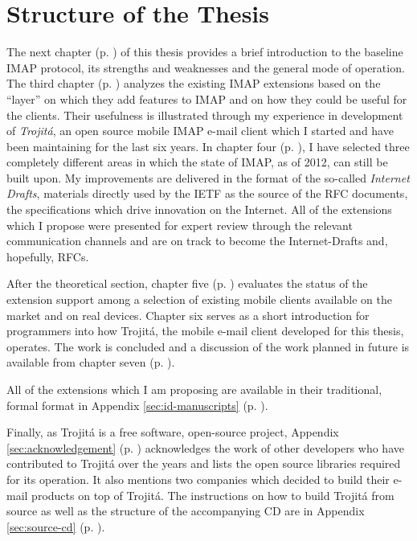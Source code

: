 \documentclass[trojita]{subfiles}
\begin{document}
\section{Structure of the Thesis}

The next chapter (p. \pageref{sec:imap-protocol}) of this thesis provides a brief introduction to the baseline IMAP
protocol, its strengths and weaknesses and the general mode of operation.  The third chapter (p.
\pageref{sec:imap-extensions}) analyzes the existing IMAP extensions based on the ``layer'' on which they add features
to IMAP and on how they could be useful for the clients.  Their usefulness is illustrated through my experience in
development of {\em Trojitá}, an open source mobile IMAP e-mail client which I started and have been maintaining for the
last six years.  In chapter four (p.  \pageref{sec:proposed-extensions}), I have selected three completely different
areas in which the state of IMAP, as of 2012, can still be built upon.  My improvements are delivered in the format of
the so-called {\em Internet Drafts}, materials directly used by the IETF as the source of the RFC documents, the
specifications which drive innovation on the Internet.  All of the extensions which I propose were presented for expert
review through the relevant communication channels and are on track to become the Internet-Drafts and, hopefully, RFCs.

After the theoretical section, chapter five (p. \pageref{sec:mobile-imap}) evaluates the status of the extension support
among a selection of existing mobile clients available on the market and on real devices.  Chapter six serves as a short
introduction for programmers into how Trojitá, the mobile e-mail client developed for this thesis, operates.  The work
is concluded and a discussion of the work planned in future is available from chapter seven (p.
\pageref{sec:conclusion}).

All of the extensions which I am proposing are available in their traditional, formal format in Appendix \ref{sec:id-manuscripts}
(p. \pageref{sec:id-manuscripts}).

Finally, as Trojitá is a free software, open-source project, Appendix \ref{sec:acknowledgement} (p.
\pageref{sec:acknowledgement}) acknowledges the work of other developers who have contributed to Trojitá over the years
and lists the open source libraries required for its operation.  It also mentions two companies which decided to build
their e-mail products on top of Trojitá.  The instructions on how to build Trojitá from source as well as the structure
of the accompanying CD are in Appendix \ref{sec:source-cd} (p. \pageref{sec:source-cd}).
\end{document}
